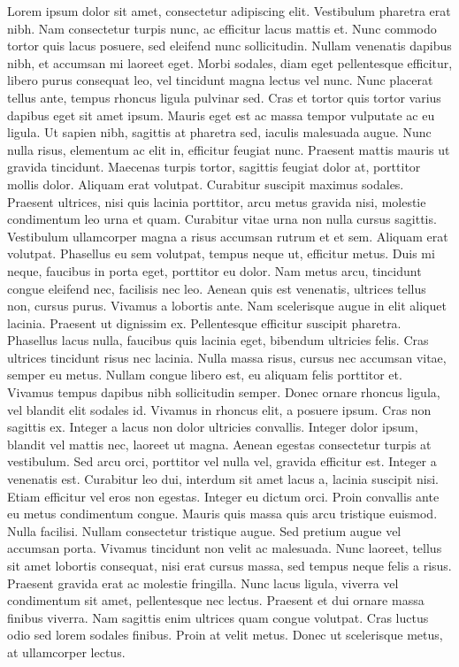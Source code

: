 \documentclass[a4paper]{memoir}
\begin{document}
Lorem ipsum dolor sit amet, consectetur adipiscing elit. Vestibulum pharetra erat nibh. Nam consectetur turpis nunc, ac efficitur lacus mattis et. Nunc commodo tortor quis lacus posuere, sed eleifend nunc sollicitudin. Nullam venenatis dapibus nibh, et accumsan mi laoreet eget. Morbi sodales, diam eget pellentesque efficitur, libero purus consequat leo, vel tincidunt magna lectus vel nunc. Nunc placerat tellus ante, tempus rhoncus ligula pulvinar sed. Cras et tortor quis tortor varius dapibus eget sit amet ipsum. Mauris eget est ac massa tempor vulputate ac eu ligula.
Ut sapien nibh, sagittis at pharetra sed, iaculis malesuada augue. Nunc nulla risus, elementum ac elit in, efficitur feugiat nunc. Praesent mattis mauris ut gravida tincidunt. Maecenas turpis tortor, sagittis feugiat dolor at, porttitor mollis dolor. Aliquam erat volutpat. Curabitur suscipit maximus sodales. Praesent ultrices, nisi quis lacinia porttitor, arcu metus gravida nisi, molestie condimentum leo urna et quam.
Curabitur vitae urna non nulla cursus sagittis. Vestibulum ullamcorper magna a risus accumsan rutrum et et sem. Aliquam erat volutpat. Phasellus eu sem volutpat, tempus neque ut, efficitur metus. Duis mi neque, faucibus in porta eget, porttitor eu dolor. Nam metus arcu, tincidunt congue eleifend nec, facilisis nec leo. Aenean quis est venenatis, ultrices tellus non, cursus purus. Vivamus a lobortis ante. Nam scelerisque augue in elit aliquet lacinia. Praesent ut dignissim ex. Pellentesque efficitur suscipit pharetra. Phasellus lacus nulla, faucibus quis lacinia eget, bibendum ultricies felis. Cras ultrices tincidunt risus nec lacinia. Nulla massa risus, cursus nec accumsan vitae, semper eu metus. Nullam congue libero est, eu aliquam felis porttitor et. Vivamus tempus dapibus nibh sollicitudin semper.
Donec ornare rhoncus ligula, vel blandit elit sodales id. Vivamus in rhoncus elit, a posuere ipsum. Cras non sagittis ex. Integer a lacus non dolor ultricies convallis. Integer dolor ipsum, blandit vel mattis nec, laoreet ut magna. Aenean egestas consectetur turpis at vestibulum. Sed arcu orci, porttitor vel nulla vel, gravida efficitur est. Integer a venenatis est. Curabitur leo dui, interdum sit amet lacus a, lacinia suscipit nisi. Etiam efficitur vel eros non egestas. Integer eu dictum orci. Proin convallis ante eu metus condimentum congue. Mauris quis massa quis arcu tristique euismod. Nulla facilisi. Nullam consectetur tristique augue.
Sed pretium augue vel accumsan porta. Vivamus tincidunt non velit ac malesuada. Nunc laoreet, tellus sit amet lobortis consequat, nisi erat cursus massa, sed tempus neque felis a risus. Praesent gravida erat ac molestie fringilla. Nunc lacus ligula, viverra vel condimentum sit amet, pellentesque nec lectus. Praesent et dui ornare massa finibus viverra. Nam sagittis enim ultrices quam congue volutpat. Cras luctus odio sed lorem sodales finibus. Proin at velit metus. Donec ut scelerisque metus, at ullamcorper lectus. 
\end{document}

